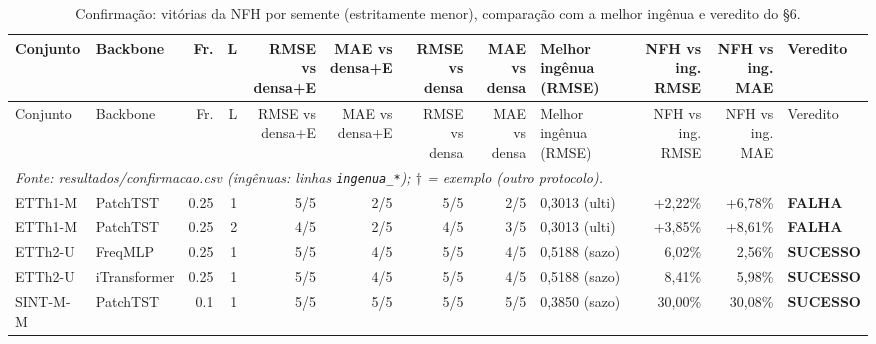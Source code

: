 \tiny
\setlength{\tabcolsep}{2pt}
\begin{longtable}{llrrrrrrlrrl}
\caption{Confirma\c{c}\~ao: vit\'orias da NFH por semente (estritamente menor), compara\c{c}\~ao com a melhor ing\^enua e veredito do \S6.}\label{tab:conf_vit}\\
\toprule
Conjunto & Backbone & Fr. & L & \shortstack[l]{RMSE vs\\ densa+E} & \shortstack[l]{MAE vs\\ densa+E} & \shortstack[l]{RMSE vs\\ densa} & \shortstack[l]{MAE vs\\ densa} & \shortstack[l]{Melhor ing\^enua\\ (RMSE)} & \shortstack[l]{NFH vs\\ ing. RMSE} & \shortstack[l]{NFH vs\\ ing. MAE} & Veredito \\ \midrule
\endfirsthead
\toprule
Conjunto & Backbone & Fr. & L & \shortstack[l]{RMSE vs\\ densa+E} & \shortstack[l]{MAE vs\\ densa+E} & \shortstack[l]{RMSE vs\\ densa} & \shortstack[l]{MAE vs\\ densa} & \shortstack[l]{Melhor ing\^enua\\ (RMSE)} & \shortstack[l]{NFH vs\\ ing. RMSE} & \shortstack[l]{NFH vs\\ ing. MAE} & Veredito \\ \midrule
\endhead
\bottomrule
\multicolumn{12}{l}{\textit{Fonte: resultados/confirmacao.csv (ing\^enuas: linhas \texttt{ingenua\_*}); $\dagger$ = exemplo (outro protocolo).}}\\
\endlastfoot
ETTh1-M & PatchTST & 0.25 & 1 & 5/5 & 2/5 & 5/5 & 2/5 & 0,3013 (ulti) & +2,22\% & +6,78\% & \textbf{FALHA} \\
ETTh1-M & PatchTST & 0.25 & 2 & 4/5 & 2/5 & 4/5 & 3/5 & 0,3013 (ulti) & +3,85\% & +8,61\% & \textbf{FALHA} \\
ETTh2-U & FreqMLP & 0.25 & 1 & 5/5 & 4/5 & 5/5 & 4/5 & 0,5188 (sazo) & \textminus{}6,02\% & \textminus{}2,56\% & \textbf{SUCESSO} \\
ETTh2-U & iTransformer & 0.25 & 1 & 5/5 & 4/5 & 5/5 & 4/5 & 0,5188 (sazo) & \textminus{}8,41\% & \textminus{}5,98\% & \textbf{SUCESSO} \\
SINT-M-M & PatchTST & 0.1 & 1 & 5/5 & 5/5 & 5/5 & 5/5 & 0,3850 (sazo) & \textminus{}30,00\% & \textminus{}30,08\% & \textbf{SUCESSO} \\

\end{longtable}
